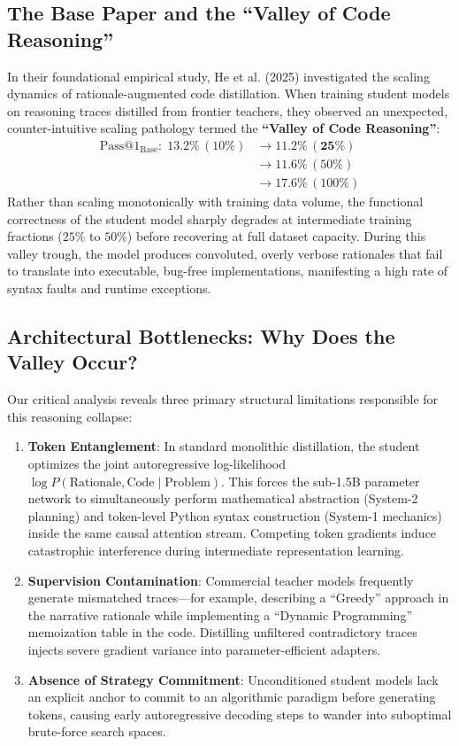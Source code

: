 \documentclass{ieeeaccess}
\begin{document}
\subsection{The Base Paper and the ``Valley of Code Reasoning''}
In their foundational empirical study, He et al. (2025) \cite{he2025valley} investigated the scaling dynamics of rationale-augmented code distillation. When training student models on reasoning traces distilled from frontier teachers, they observed an unexpected, counter-intuitive scaling pathology termed the \textbf{``Valley of Code Reasoning''}:
\begin{equation}
\label{eq:valley_base}
\begin{aligned}
\text{Pass@1}_{\text{Base}}: \; 13.2\% \,(10\%) &\longrightarrow \mathbf{11.2\% \,(25\%)} \\
&\longrightarrow 11.6\% \,(50\%) \\
&\longrightarrow 17.6\% \,(100\%)
\end{aligned}
\end{equation}
Rather than scaling monotonically with training data volume, the functional correctness of the student model sharply degrades at intermediate training fractions ($25\%$ to $50\%$) before recovering at full dataset capacity. During this valley trough, the model produces convoluted, overly verbose rationales that fail to translate into executable, bug-free implementations, manifesting a high rate of syntax faults and runtime exceptions.

\subsection{Architectural Bottlenecks: Why Does the Valley Occur?}
Our critical analysis reveals three primary structural limitations responsible for this reasoning collapse:
\begin{enumerate}
    \item \textbf{Token Entanglement}: In standard monolithic distillation, the student optimizes the joint autoregressive log-likelihood $\log P(\text{Rationale}, \text{Code} \mid \text{Problem})$. This forces the sub-1.5B parameter network to simultaneously perform mathematical abstraction (System-2 planning) and token-level Python syntax construction (System-1 mechanics) inside the same causal attention stream. Competing token gradients induce catastrophic interference during intermediate representation learning.
    \item \textbf{Supervision Contamination}: Commercial teacher models frequently generate mismatched traces---for example, describing a ``Greedy'' approach in the narrative rationale while implementing a ``Dynamic Programming'' memoization table in the code. Distilling unfiltered contradictory traces injects severe gradient variance into parameter-efficient adapters.
    \item \textbf{Absence of Strategy Commitment}: Unconditioned student models lack an explicit anchor to commit to an algorithmic paradigm before generating tokens, causing early autoregressive decoding steps to wander into suboptimal brute-force search spaces.
\end{enumerate}
\end{document}
